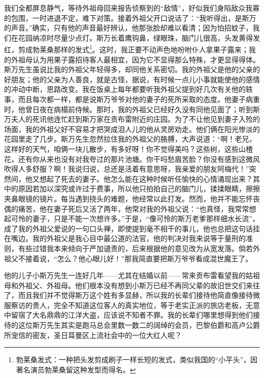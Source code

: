 \par 我们全都屏息静气，等待外祖母回来报告侦察到的“敌情”，好似我们身陷敌众我寡的包围，一时进退不定，难下对策。接着外祖父开口说话了：“我听得出，是斯万的声音。”确实，只有他的声音最好辨认，他那张脸却难以看清；因为怕招蚊子，我们在花园纳凉时尽量少点灯。斯万长着鹰钩鼻，绿眼珠，脑门儿很高，头发黄得发红，剪成勃莱桑那样的发式\footnote{勃莱桑发式：一种把头发剪成刷子一样长短的发式，类似我国的“小平头”，因著名演员勃莱桑留这种发型而得名。}。这时，我正要不动声色地吩咐仆人拿果子露来；我的外祖母认为用果子露招待客人最相宜，因为它不显得那么特殊，才更显得得体。斯万先生虽说比我的外祖父年轻得多，却同他关系密切。我的外祖父是他的父亲的好朋友；他的父亲为人善良，就是古怪，据说，有时候一点儿小事就能使他的感情的冲动中断，思路改变。我在饭桌上每年都要听我外祖父提到好几次有关他的轶事，而且每次都一样，都是说斯万爷爷对他的妻子的死所采取的态度。他妻子病重时，他曾日夜在病榻前侍候。那时，我的外祖父已经好久没有同他见面了；听到斯万夫人的死讯他连忙赶到斯万家在贡布雷附近的庄园。为了不让他见到妻子入殓的场面，我的外祖父好不容易才把哭成泪人儿的他从灵房劝走。他们俩在阳光惨淡的花园里走了几步。斯万先生忽然拉住我的外祖父的胳膊，大声说道：“啊！老兄，这样好的天气，咱俩一块儿散步，有多好呀！你不觉得美吗？这些树，这些山楂花，还有你从来也没有对我夸过的那片池塘。你干吗愁眉苦脸？你没有感到这微风吹得人多舒服？啊！我说归说，总还是活着有意思呀，我亲爱的朋友阿梅代！”突然间，他又想起了死去的妻子。他怎么能在这种时候听任愉快的心情涌现出来？其中的原因若加以深究或许过于费事，所以他只拍拍自己的脑门儿，揉揉眼睛，擦擦夹鼻眼镜的镜片。每当遇到挠头的难题，他经常以此打发。然而，他并不能忘怀丧偶的痛苦，他在妻子死后又活了两年，他常对我的外祖父说：“也真怪，我常常想起可怜的妻子，只是不能一次想许多。”于是，“像可怜的斯万老爹那样细水长流”，成了我的外祖父爱说的一句口头禅，即使提到毫不相干的事儿，他也总把这句话挂在嘴边。我的外祖父是我心目中最公道的法官，他的判决对我来说等于量刑的准则，有些过错我本来倾向于严加谴责的，后来根据他的意见改为从宽发落。倘若外祖父不接着说，“怎么？他心眼儿好！”那我简直要把斯万爷爷看成混世魔王了。
\par 他的儿子小斯万先生一连好几年——尤其在结婚以前——常来贡布雷看望我的姑祖母和外祖父、外祖母。他们根本没有想到小斯万已经不再同父辈的故旧世交们来往了，而且我们并不觉得斯万这个姓有多显赫，所以我的长辈们接待他简直像接待微服察访的贵人，完全不知道这位客人的真实地位，等于老实正派的旅店老板，无意中留宿了大名鼎鼎的江洋大盗，应该说不知者不罪。我的长辈们哪里想得到他们接待的这位斯万先生其实是跑马总会里数一数二的阔绰的会员，巴黎伯爵和高卢公爵所宠信的密友，圣日耳曼区上流社会中的一位大红人呢？
